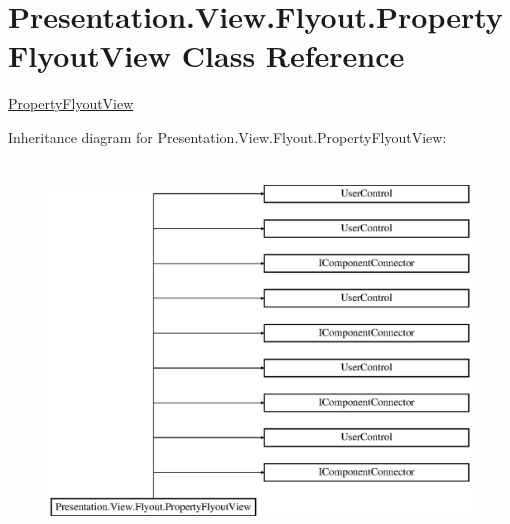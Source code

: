 \hypertarget{class_presentation_1_1_view_1_1_flyout_1_1_property_flyout_view}{}\section{Presentation.\+View.\+Flyout.\+Property\+Flyout\+View Class Reference}
\label{class_presentation_1_1_view_1_1_flyout_1_1_property_flyout_view}


\hyperlink{class_presentation_1_1_view_1_1_flyout_1_1_property_flyout_view}{Property\+Flyout\+View}  


Inheritance diagram for Presentation.\+View.\+Flyout.\+Property\+Flyout\+View\+:\begin{figure}[H]
\begin{center}
\leavevmode
\includegraphics[height=10.000000cm]{class_presentation_1_1_view_1_1_flyout_1_1_property_flyout_view}
\end{center}
\end{figure}
